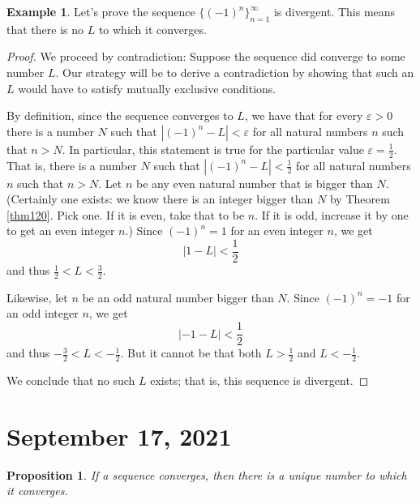 \documentclass[12pt]{amsart}
\def\e{\varepsilon}
\numberwithin{equation}{section}
\theoremstyle{plain} %
\newtheorem{prop}[equation]{Proposition}
\newcommand{\Sept}[1]{\section{September #1, 2021}}
\theoremstyle{definition}
\newtheorem{ex}[equation]{Example}
\theoremstyle{remark}
\begin{document}
\begin{ex} Let's prove the sequence $\{(-1)^n\}_{n=1}^\infty$ is divergent. This means that there is no $L$ to which it converges. 

\begin{proof}
  We proceed by contradiction: Suppose the sequence did converge to some number $L$. Our strategy will be to derive a contradiction by showing that such
  an $L$ would have to satisfy mutually exclusive conditions. 

By definition, since the sequence converges to $L$, we have that 
for every $\e > 0$ there is a number $N$ such that 
$|(-1)^n - L| < \e$
for all natural numbers $n$ such that $n > N$.
In particular, this statement is true for the particular value $\e = \frac12$. That is,  there is a number $N$ such that  
$|(-1)^n - L| < \frac12$ for all natural numbers $n$ such that  
$n > N$. Let $n$ be any even natural number that is bigger than
$N$. (Certainly one exists: we know there is an integer bigger than
$N$
by Theorem \ref{thm120}. Pick one. If it is even, take that to be
$n$. If it is odd, increase it by one to get an even integer $n$.)  Since $(-1)^n = 1$ for an even integer $n$, we get
$$
|1 - L| < \frac12
$$
and thus $\frac12 < L < \frac32$.

Likewise, let $n$ be an odd natural number bigger than $N$. Since $(-1)^n = -1$ for an odd integer $n$, we get
$$
|-1 - L| < \frac12
$$
and thus $-\frac32 < L < -\frac12$. But it cannot be that both $L > \frac12$ and $L < -\frac12$.

We conclude that no such $L$ exists; that is, this sequence is divergent.
\end{proof}
\end{ex}

\Sept{17}


\begin{prop} If a sequence converges, then there is a unique number to which it converges.
\end{prop}
\end{document}
